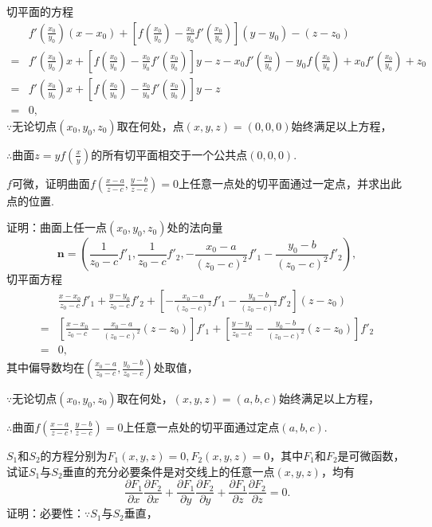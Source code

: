 \documentclass[12pt,UTF8]{ctexart}
\begin{document}
\begin{enumerate}
切平面的方程
\[\begin{split}
&f'(\frac{x_0}{y_0})(x-x_0)+[f(\frac{x_0}{y_0})-\frac{x_0}{y_0}f'(\frac{x_0}{y_0})](y-y_0)-(z-z_0)\\
=&f'(\frac{x_0}{y_0})x+[f(\frac{x_0}{y_0})-\frac{x_0}{y_0}f'(\frac{x_0}{y_0})]y-z-x_0f'(\frac{x_0}{y_0})-y_0f(\frac{x_0}{y_0})+x_0f'(\frac{x_0}{y_0})+z_0\\
=&f'(\frac{x_0}{y_0})x+[f(\frac{x_0}{y_0})-\frac{x_0}{y_0}f'(\frac{x_0}{y_0})]y-z\\
=&0,
\end{split}\]
$\because$无论切点$(x_0,y_0,z_0)$取在何处，点$(x,y,z)=(0,0,0)$始终满足以上方程，

$\therefore$曲面$z=yf(\frac xy)$的所有切平面相交于一个公共点$(0,0,0)$.

$f$可微，证明曲面$f(\frac{x-a}{z-c},\frac{y-b}{z-c})=0$上任意一点处的切平面通过一定点，并求出此点的位置.

证明：曲面上任一点$(x_0,y_0,z_0)$处的法向量
\[
\bm n=(\frac1{z_0-c}f'_1,\frac1{z_0-c}f'_2,-\frac{x_0-a}{(z_0-c)^2}f'_1-\frac{y_0-b}{(z_0-c)^2}f'_2),
\]
切平面方程
\[\begin{split}
&\frac{x-x_0}{z_0-c}f'_1+\frac{y-y_0}{z_0-c}f'_2+[-\frac{x_0-a}{(z_0-c)^2}f'_1-\frac{y_0-b}{(z_0-c)^2}f'_2](z-z_0)\\
=&[\frac{x-x_0}{z_0-c}-\frac{x_0-a}{(z_0-c)^2}(z-z_0)]f'_1+[\frac{y-y_0}{z_0-c}-\frac{y_0-b}{(z_0-c)^2}(z-z_0)]f'_2\\
=&0,
\end{split}\]
其中偏导数均在$(\frac{x_0-a}{z_0-c},\frac{y_0-b}{z_0-c})$处取值，

$\because$无论切点$(x_0,y_0,z_0)$取在何处，$(x,y,z)=(a,b,c)$始终满足以上方程，

$\therefore$曲面$f(\frac{x-a}{z-c},\frac{y-b}{z-c})=0$上任意一点处的切平面通过定点$(a,b,c)$.

$S_1$和$S_2$的方程分别为$F_1(x,y,z)=0,F_2(x,y,z)=0$，其中$F_1$和$F_2$是可微函数，试证$S_1$与$S_2$垂直的充分必要条件是对交线上的任意一点$(x,y,z)$，均有
\[
\frac{\partial F_1}{\partial x}\frac{\partial F_2}{\partial x}+\frac{\partial F_1}{\partial y}\frac{\partial F_2}{\partial y}+\frac{\partial F_1}{\partial z}\frac{\partial F_2}{\partial z}=0.
\]
证明：必要性：$\because S_1$与$S_2$垂直，


\end{enumerate}
\end{document}

